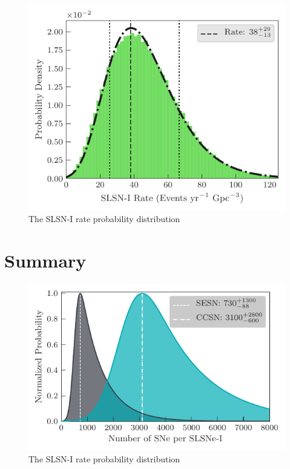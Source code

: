 \documentclass[a4paper,fleqn,usenatbib]{mnras}
\begin{document}
\begin{figure}
	\includegraphics[width=\linewidth]{./SLSN_Rate_Dist.pdf}
    \caption{The SLSN-I rate probability distribution}
    \label{fig:SLSNrateProbDist}
\end{figure}



\section{Summary}


\begin{figure}
	\includegraphics[width=\linewidth]{./bothRateCompare.pdf}
    \caption{The SLSN-I rate probability distribution}
    \label{fig:compare2SLSN}
\end{figure}
\end{document}
